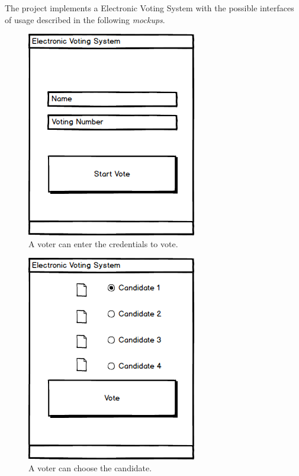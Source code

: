 \documentclass{article}
\begin{document}
The project implements a Electronic Voting System with the possible interfaces of usage described in the following \textit{mockups}.

\begin{figure}[H]
\centering
	\includegraphics[scale=0.5]{1.png}
	\caption{A voter can enter the credentials to vote.}
	\label{fig:PropProf}
\end{figure}

\begin{figure}[H]
\centering
	\includegraphics[scale=0.5]{2.png}
	\caption{A voter can choose the candidate.}
	\label{fig:PropProf}
\end{figure}
\end{document}
